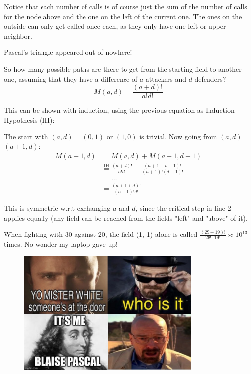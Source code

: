 \documentclass[11pt,a4paper]{article}
\begin{document}
Notice that each number of calls is of course just the sum of the number of calls for the node above and the one on the left of the current one. The ones on the outside can only get called once each, as they only have one left or upper neighbor.

Pascal's triangle appeared out of nowhere!

So how many possible paths are there to get from the starting field to another one, assuming that they have a difference of $a$ attackers and $d$ defenders?
\[ M(a, d) = \frac{(a + d)!}{a! d!} \]

This can be shown with induction, using the previous equation as Induction Hypothesis (IH):

The start with $(a, d) = (0, 1)$ or $(1, 0)$ is trivial. Now going from $(a, d)$ $(a+1, d)$:
\[ \begin{aligned} M(a+1, d) & = M(a, d) + M(a+1, d-1) \\ & \overset{\mathrm{IH}}{=} \frac{(a + d)!}{a! d!} + \frac{(a+1 + d-1)!}{(a+1)! (d-1)!} \\ & = \ldots \\ & = \frac{(a+1 + d)!}{(a+1)! d!} \end{aligned} \]

This is symmetric w.r.t exchanging $a$ and $d$, since the critical step in line 2 applies equally (any field can be reached from the fields "left" and "above" of it).

When fighting with 30 against 20, the field (1, 1) alone is called $\frac{(29 + 19)!}{29! \cdot 19!} \approx 10^{13}$ times. No wonder my laptop gave up!

\begin{figure}[H]
\centering
\includegraphics[width=0.8\textwidth]{../images/pascale meme2.jpg}
\end{figure}
\end{document}
